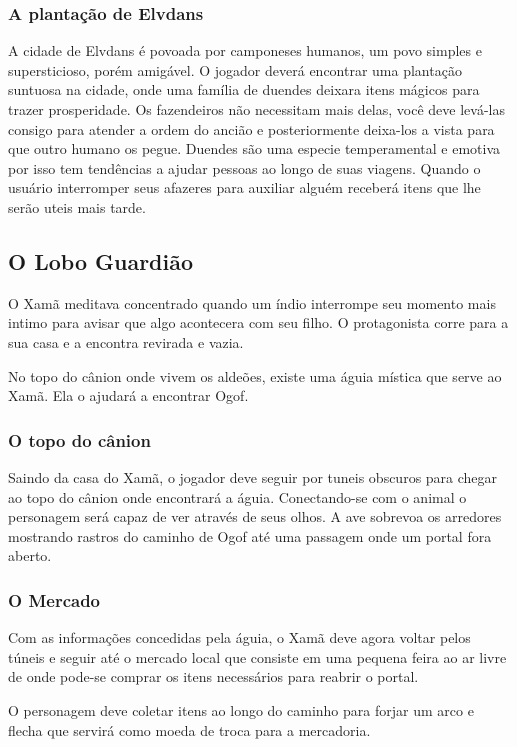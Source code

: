 \subsubsection{A plantação de Elvdans}
A cidade de Elvdans é povoada por camponeses humanos, um povo simples e supersticioso, porém amigável. O jogador deverá encontrar uma plantação suntuosa na cidade, onde uma família de duendes deixara itens mágicos para trazer prosperidade. Os fazendeiros não necessitam mais delas, você deve levá-las consigo para atender a ordem do ancião e posteriormente deixa-los a vista para que outro humano os pegue. Duendes são uma especie temperamental e emotiva por isso tem tendências a ajudar pessoas ao longo de suas viagens. Quando o usuário interromper seus afazeres para auxiliar alguém receberá itens que lhe serão uteis mais tarde.

\subsection{O Lobo Guardião}

O Xamã meditava concentrado quando um índio interrompe seu momento mais intimo para avisar que algo acontecera com seu filho. O protagonista corre para a sua casa e a encontra revirada e vazia.

No topo do cânion onde vivem os aldeões, existe uma águia mística que serve ao Xamã. Ela o ajudará a encontrar Ogof.

\subsubsection{O topo do cânion}
Saindo da casa do Xamã, o jogador deve seguir por tuneis obscuros para chegar ao topo do cânion onde encontrará a águia. Conectando-se com o animal o personagem será capaz de ver através de seus olhos. A ave sobrevoa os arredores mostrando rastros do caminho de Ogof até uma passagem onde um portal fora aberto.

\subsubsection{O Mercado}
Com as informações concedidas pela águia, o Xamã deve agora voltar pelos túneis e seguir até o mercado local que consiste em uma pequena feira ao ar livre de onde pode-se comprar os itens necessários para reabrir o portal.

O personagem deve coletar itens ao longo do caminho para forjar um arco e flecha que servirá como moeda de troca para a mercadoria.

